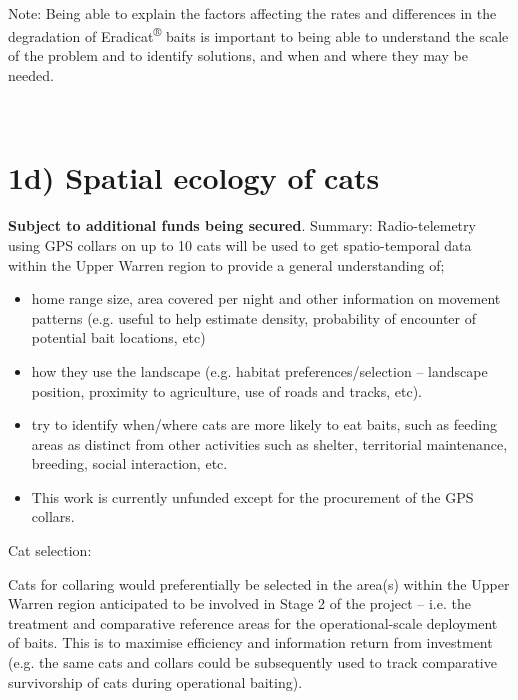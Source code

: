 \documentclass[version=last,
    paper=a4,                               %
    10pt,                                   %
    dvipsnames,
    oneside,                              %
    headings=openany,                       %
    open=any,
    BCOR=7mm,                               %
    DIV=15,     %
]{scrbook}
\begin{document}
~

Note: Being able to explain the factors affecting the rates and
differences in the degradation of Eradicat\textsuperscript{®} baits is
important to being able to understand the scale of the problem and to
identify solutions, and when and where they may be needed.

~

\section{1d) Spatial ecology of cats}

\textbf{Subject to additional funds being secured}. Summary:
Radio-telemetry using GPS collars on up to 10 cats will be used to get
spatio-temporal data within the Upper Warren region to provide a general
understanding of;

\begin{itemize}
\itemsep1pt\parskip0pt
\item
  home range size, area covered per night and other information on
  movement patterns (e.g. useful to help estimate density, probability
  of encounter of potential bait locations, etc)
\item
  how they use the landscape (e.g. habitat preferences/selection --
  landscape position, proximity to agriculture, use of roads and tracks,
  etc).
\item
  try to identify when/where cats are more likely to eat baits, such as
  feeding areas as distinct from other activities such as shelter,
  territorial maintenance, breeding, social interaction, etc.
\item
  This work is currently unfunded except for the procurement of the GPS
  collars.
\end{itemize}

Cat selection:

Cats for collaring would preferentially be selected in the area(s)
within the Upper Warren region anticipated to be involved in Stage 2 of
the project -- i.e. the treatment and comparative reference areas for
the operational-scale deployment of baits. This is to maximise
efficiency and information return from investment (e.g. the same cats
and collars could be subsequently used to track comparative survivorship
of cats during operational baiting).
\end{document}
